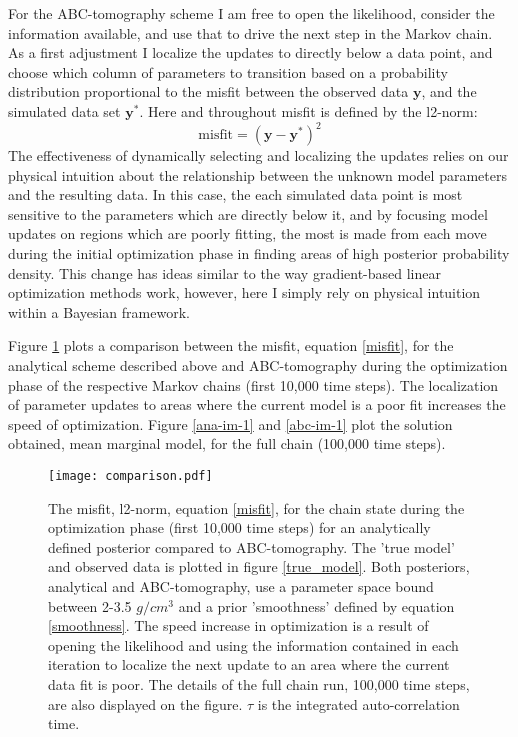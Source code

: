For the ABC-tomography scheme I am free to open the likelihood, consider the information available, and use that to drive the next step in the Markov chain. As a first adjustment I localize the updates to directly below a data point, and choose which column of parameters to transition based on a probability distribution proportional to the misfit between the observed data $\bm{y}$, and the simulated data set $\bm{y^*}$. Here and throughout misfit is defined by the l2-norm:
\begin{equation}
	\text{misfit} = (\bm{y}-\bm{y^*})^2
	\label{misfit}
\end{equation}
The effectiveness of dynamically selecting and localizing the updates relies on our physical intuition about the relationship between the unknown model parameters and the resulting data. In this case, the each simulated data point is most sensitive to the parameters which are directly below it, and by focusing model updates on regions which are poorly fitting, the most is made from each move during the initial optimization phase in finding areas of high posterior probability density. This change has ideas similar to the way gradient-based linear optimization methods work, however, here I simply rely on physical intuition within a Bayesian framework. \par
Figure \ref{comparison-1} plots a comparison between the misfit, equation \ref{misfit}, for the analytical scheme described above and ABC-tomography during the optimization phase of the respective Markov chains (first 10,000 time steps). The localization of parameter updates to areas where the current model is a poor fit increases the speed of optimization. Figure \ref{ana-im-1} and \ref{abc-im-1} plot the solution obtained, mean marginal model, for the full chain (100,000 time steps).\par

\begin{figure}[H]
	\centering
	\texttt{[image: comparison.pdf]}
	\caption{The misfit, l2-norm, equation \ref{misfit}, for the chain state during the optimization phase (first 10,000 time steps) for an analytically defined posterior compared to ABC-tomography. The 'true model' and observed data is plotted in figure \ref{true_model}. Both posteriors, analytical and ABC-tomography, use a parameter space bound between 2-3.5 $g/cm^3$ and a prior 'smoothness' defined by equation \ref{smoothness}. The speed increase in optimization is a result of opening the likelihood and using the information contained in each iteration to localize the next update to an area where the current data fit is poor. The details of the full chain run, 100,000 time steps, are also displayed on the figure. $\tau$ is the integrated auto-correlation time.}
	\label{comparison-1}
\end{figure}

